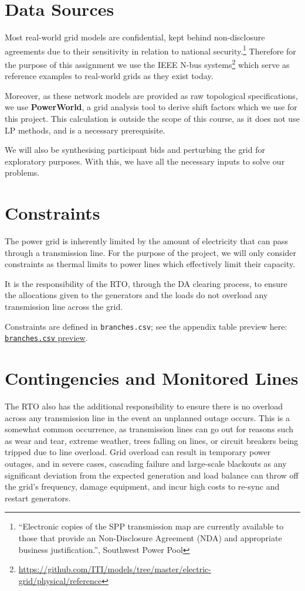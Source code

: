 \documentclass[11pt]{article}
\begin{document}
\section{Data Sources}
Most real-world grid models are confidential, kept behind non-disclosure agreements due to their sensitivity in relation to national security.\footnote{``Electronic copies of the SPP transmission map are currently available to those that provide an Non-Disclosure Agreement (NDA) and appropriate business justification.'', Southwest Power Pool} Therefore for the purpose of this assignment we use the IEEE N-bus systems\footnote{\url{https://github.com/ITI/models/tree/master/electric-grid/physical/reference}} which serve as reference examples to real-world grids as they exist today.

Moreover, as these network models are provided as raw topological specifications, we use \textbf{PowerWorld}, a grid analysis tool to derive shift factors which we use for this project. This calculation is outside the scope of this course, as it does not use LP methods, and is a necessary prerequisite.

We will also be synthesising participant bids and perturbing the grid for exploratory purposes. With this, we have all the necessary inputs to solve our problems.

\section{Constraints}
The power grid is inherently limited by the amount of electricity that can pass through a transmission line. For the purpose of the project, we will only consider constraints as thermal limits to power lines which effectively limit their capacity.

It is the responsibility of the RTO, through the DA clearing process, to ensure the allocations given to the generators and the loads do not overload any transmission line across the grid.

Constraints are defined in \texttt{branches.csv}; see the appendix table preview here: \hyperref[app:branches-preview]{\texttt{branches.csv} preview}.

\section{Contingencies and Monitored Lines}
The RTO also has the additional responsibility to ensure there is no overload across any transmission line in the event an unplanned outage occurs. This is a somewhat common occurrence, as transmission lines can go out for reasons such as wear and tear, extreme weather, trees falling on lines, or circuit breakers being tripped due to line overload. Grid overload can result in temporary power outages, and in severe cases, cascading failure and large-scale blackouts as any significant deviation from the expected generation and load balance can throw off the grid's frequency, damage equipment, and incur high costs to re-sync and restart generators.
\end{document}

